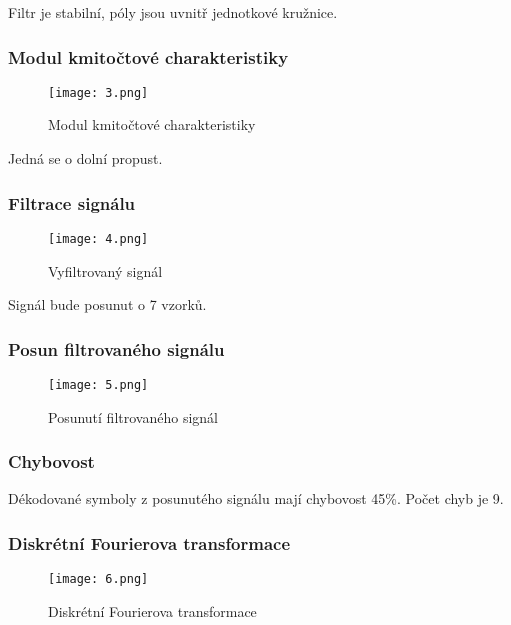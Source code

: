 \documentclass[a4paper,10pt]{article}
\begin{document}
\begin{multicols}{2}
Filtr je stabilní, póly jsou uvnitř jednotkové kružnice.

\subsubsection*{Modul kmitočtové charakteristiky}

\begin{figure}[H]
	\centering
	\texttt{[image: 3.png]}
	\caption{Modul kmitočtové charakteristiky }
	\label{fig:obr3}
\end{figure}

Jedná se o dolní propust.

\subsubsection*{Filtrace signálu}

\begin{figure}[H]
	\centering
	\texttt{[image: 4.png]}
	\caption{Vyfiltrovaný signál }
	\label{fig:obr4}
\end{figure}

Signál bude posunut o 7 vzorků.

\subsubsection*{Posun filtrovaného signálu}

\begin{figure}[H]
	\centering
	\texttt{[image: 5.png]}
	\caption{Posunutí filtrovaného signál }
	\label{fig:obr5}
\end{figure}

\subsubsection*{Chybovost}

Dékodované symboly z posunutého signálu mají chybovost 45\%. Počet chyb je 9.

\subsubsection*{Diskrétní Fourierova transformace}

\begin{figure}[H]
	\centering
	\texttt{[image: 6.png]}
	\caption{Diskrétní Fourierova transformace}
	\label{fig:obr6}
\end{figure}


\end{multicols}
\end{document}
